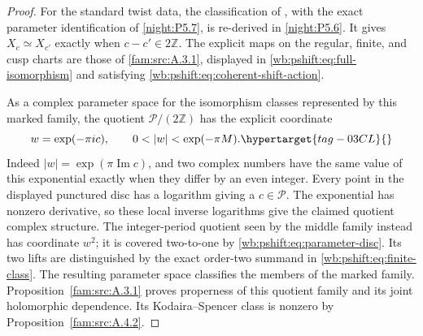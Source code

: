 \hypertarget{tag-000C}{}\label{app:rederive:fam-src-A.5.1}
\begin{proof}
For the standard twist data, the classification of
\cite[Theorem~1.4, p.~3]{DuEtAl2026v1}, with the exact parameter
identification of \cref{night:P5.7}, is re-derived in
\cref{night:P5.6}. It gives $X_c\simeq X_{c'}$ exactly when
$c-c'\in2\mathbb Z$. The explicit maps on the regular, finite,
and cusp charts are those of \cref{fam:src:A.3.1}, displayed in
\eqref{wb:pshift:eq:full-isomorphism} and satisfying
\eqref{wb:pshift:eq:coherent-shift-action}.

As a complex parameter space for the isomorphism classes represented
by this marked family, the quotient $\mathcal P/(2\mathbb Z)$ has
the explicit coordinate
\begin{equation}
 w=\exp(-\pi ic),\qquad 0<|w|<\exp(-\pi M).
 \hypertarget{tag-03CL}{}\label{wb:pshift:eq:parameter-disc}
\end{equation}
Indeed $|w|=\exp(\pi\operatorname{Im}c)$, and two complex numbers
have the same value of this exponential exactly when they differ
by an even integer. Every point in the displayed punctured disc
has a logarithm giving a $c\in\mathcal P$. The exponential has
nonzero derivative, so these local inverse logarithms give the
claimed quotient complex structure. The integer-period quotient
seen by the middle family instead has coordinate $w^2$; it is
covered two-to-one by \eqref{wb:pshift:eq:parameter-disc}. Its two lifts are distinguished by
the exact order-two summand in \eqref{wb:pshift:eq:finite-class}. The resulting parameter space classifies the members of the marked family.
Proposition~\ref{fam:src:A.3.1} proves properness of this quotient
family and its joint holomorphic dependence. Its Kodaira--Spencer
class is nonzero by Proposition~\ref{fam:src:A.4.2}.
\end{proof}

